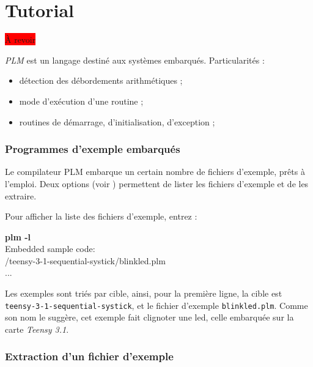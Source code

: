 

\chapter{Tutorial}

\thispagestyle{empty}

\colorbox{red}{À revoir}


\emph{PLM} est un langage destiné aux systèmes embarqués. Particularités :
\begin{itemize}
  \item détection des débordements arithmétiques ;
  \item mode d'exécution d'une routine ;
  \item routines de démarrage, d'initialisation, d'exception ;
\end{itemize}




\subsection{Programmes d'exemple embarqués}

Le compilateur PLM embarque un certain nombre de fichiers d'exemple, prêts à l'emploi. Deux options (voir ) permettent de lister les fichiers d'exemple et de les extraire.

Pour afficher la liste des fichiers d'exemple, entrez :

\begin{SHELL}
{\bfseries plm -l}\\
Embedded sample code:\\ 
\hspace*{1.2em}/teensy-3-1-sequential-systick/blinkled.plm\\
\hspace*{1.2em}...
\end{SHELL}

Les exemples sont triés par cible, ainsi, pour la première ligne, la cible est \texttt{teensy-3-1-sequential-systick}, et le fichier d'exemple \texttt{blinkled.plm}. Comme son nom le suggère, cet exemple fait clignoter une led, celle embarquée sur la carte \emph{Teensy 3.1}.

\subsection{Extraction d'un fichier d'exemple}

